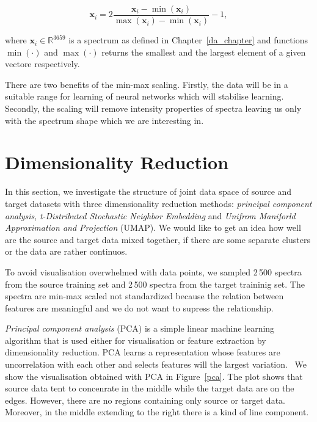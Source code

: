 \begin{equation}
	\mathbf{x}_i = 2 \frac{\mathbf{x}_i - \min(\mathbf{x}_i)}{
		\max(\mathbf{x}_i) - \min(\mathbf{x}_i)} - 1,
\end{equation}

where \(\mathbf{x}_i \in \mathbb{R}^{3659}\) is a spectrum as defined in Chapter~\ref{da_chapter}
and functions \(\min(\cdot)\) and \(\max(\cdot)\) returns the smallest and the largest element of a given vectore respectively.

There are two benefits of the min-max scaling.
Firstly, the data will be in a suitable range for learning of neural networks
which will stabilise learning.
Secondly, the scaling will remove intensity properties of spectra
leaving us only with the spectrum shape which we are interesting in.

\section{Dimensionality Reduction}

In this section, we investigate the structure of joint data space of source and target datasets with three dimensionality reduction methods:
\textit{principal component analysis},
\textit{t-Distributed Stochastic Neighbor Embedding}
and \textit{Unifrom Maniforld Approximation and Projection} (UMAP).
We would like to get an idea how well are the source and target data mixed together,
if there are some separate clusters or the data are rather continuos.

To avoid visualisation overwhelmed with data points,
we sampled 2\,500 spectra from the source training set
and 2\,500 spectra from the target traininig set.
The spectra are min-max scaled not standardized
because the relation between features are meaningful
and we do not want to supress the relationship.

\textit{Principal component analysis} (PCA) is a simple linear machine learning algorithm
that is used either for visualisation or feature extraction by dimensionality reduction.
PCA learns a representation whose features are uncorrelation with each other
and selects features will the largest variation.~\cite{goodfellow2016}
We show the visualisation obtained with PCA in Figure~\ref{pca}.
The plot shows that source data tent to concenrate in the middle
while the target data are on the edges.
However, there are no regions containing only source or target data.
Moreover, in the middle extending to the right there is a kind of line component.

